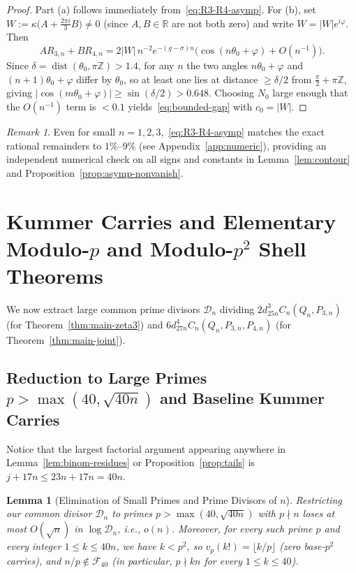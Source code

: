 \documentclass[11pt,reqno]{amsart}
\newtheorem{lemma}[theorem]{Lemma}
\theoremstyle{definition}
\theoremstyle{remark}
\newtheorem{remark}[theorem]{Remark}
\newcommand{\ZZ}{\mathbb{Z}}
\newcommand{\RR}{\mathbb{R}}
\newcommand{\dist}{\operatorname{dist}}
\begin{document}
\begin{proof}
Part (a) follows immediately from~\eqref{eq:R3-R4-asymp}. For (b), set $W := \kappa\bigl(A + \frac{2\pi i}{3}B\bigr) \ne 0$ (since $A, B \in \RR$ are not both zero) and write $W = |W| e^{i\varphi}$. Then
\[
  A R_{3,n} + B R_{4,n} = 2|W|\, n^{-2} e^{-(g - \sigma)n}\bigl(\cos(n\theta_0 + \varphi) + O(n^{-1})\bigr).
\]
Since $\delta = \dist(\theta_0, \pi\ZZ) > 1.4$, for any $n$ the two angles $n\theta_0 + \varphi$ and $(n+1)\theta_0 + \varphi$ differ by $\theta_0$, so at least one lies at distance $\ge \delta/2$ from $\frac{\pi}{2} + \pi\ZZ$, giving $|\cos(m\theta_0 + \varphi)| \ge \sin(\delta/2) > 0.648$. Choosing $N_0$ large enough that the $O(n^{-1})$ term is $< 0.1$ yields~\eqref{eq:bounded-gap} with $c_0 = |W|$.
\end{proof}

\begin{remark}
Even for small $n = 1, 2, 3$,~\eqref{eq:R3-R4-asymp} matches the exact rational remainders to $1\%$--$9\%$ (see Appendix~\ref{app:numeric}), providing an independent numerical check on all signs and constants in Lemma~\ref{lem:contour} and Proposition~\ref{prop:asymp-nonvanish}.
\end{remark}

\section{Kummer Carries and Elementary Modulo-\texorpdfstring{$p$}{p} and Modulo-\texorpdfstring{$p^2$}{p2} Shell Theorems}
\label{sec:fp-shells}

We now extract large common prime divisors $\mathcal{D}_n$ dividing $2 d_{25n}^3 C_n(Q_n, P_{3,n})$ (for Theorem~\ref{thm:main-zeta3}) and $6 d_{27n}^4 C_n(Q_n, P_{3,n}, P_{4,n})$ (for Theorem~\ref{thm:main-joint}).

\subsection{Reduction to Large Primes \texorpdfstring{$p > \max(40, \sqrt{40n})$}{p > max(40, sqrt(40n))} and Baseline Kummer Carries}
Notice that the largest factorial argument appearing anywhere in Lemma~\ref{lem:binom-residues} or Proposition~\ref{prop:tails} is $j + 17n \le 23n + 17n = 40n$.

\begin{lemma}[Elimination of Small Primes and Prime Divisors of $n$]
\label{lem:small-primes}
Restricting our common divisor $\mathcal{D}_n$ to primes $p > \max(40, \sqrt{40n})$ with $p \nmid n$ loses at most $O(\sqrt{n})$ in $\log\mathcal{D}_n$, i.e., $o(n)$. Moreover, for every such prime $p$ and every integer $1 \le k \le 40n$, we have $k < p^2$, so $v_p(k!) = \lfloor k/p \rfloor$ (zero base-$p^2$ carries), and $n/p \notin \mathcal{F}_{40}$ (in particular, $p \nmid kn$ for every $1 \le k \le 40$).
\end{lemma}
\end{document}
